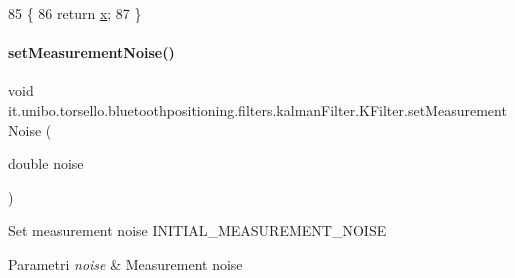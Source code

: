 \begin{DoxyCode}
85                                      \{
86         \textcolor{keywordflow}{return} \hyperlink{classit_1_1unibo_1_1torsello_1_1bluetoothpositioning_1_1filters_1_1kalmanFilter_1_1KFilter_ad07c13a7c5d92b40ff76743a8734014b_ad07c13a7c5d92b40ff76743a8734014b}{x};
87     \}
\end{DoxyCode}
\hypertarget{classit_1_1unibo_1_1torsello_1_1bluetoothpositioning_1_1filters_1_1kalmanFilter_1_1KFilter_a75bc6ea2e1d879f4fbca6143e6c0f0a8_a75bc6ea2e1d879f4fbca6143e6c0f0a8}{}\label{classit_1_1unibo_1_1torsello_1_1bluetoothpositioning_1_1filters_1_1kalmanFilter_1_1KFilter_a75bc6ea2e1d879f4fbca6143e6c0f0a8_a75bc6ea2e1d879f4fbca6143e6c0f0a8} 
\paragraph{\texorpdfstring{set\+Measurement\+Noise()}{setMeasurementNoise()}}
{\footnotesize\ttfamily void it.\+unibo.\+torsello.\+bluetoothpositioning.\+filters.\+kalman\+Filter.\+K\+Filter.\+set\+Measurement\+Noise (\begin{DoxyParamCaption}\item[{double}]{noise }\end{DoxyParamCaption})}

Set measurement noise I\+N\+I\+T\+I\+A\+L\+\_\+\+M\+E\+A\+S\+U\+R\+E\+M\+E\+N\+T\+\_\+\+N\+O\+I\+SE


\begin{DoxyParams}{Parametri}
{\em noise} & Measurement noise \\
\hline
\end{DoxyParams}


